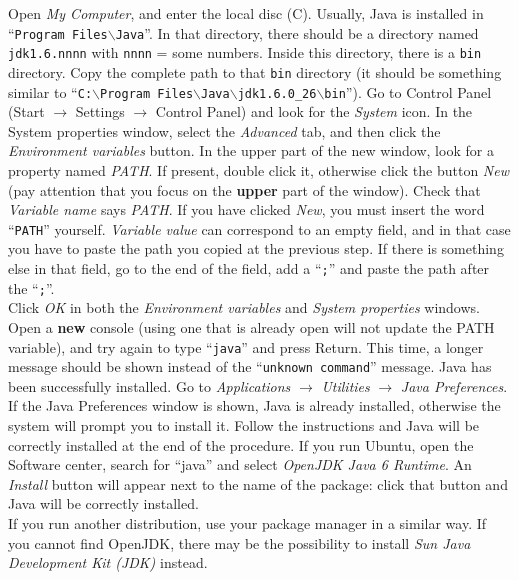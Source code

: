 \begin{enumerate}
{Open \emph{My Computer}, and enter the local disc (C). Usually, Java is installed in ``{\tt Program
Files$\backslash{}$Java}''. In that directory,
there should be a directory named {\tt jdk1.6.nnnn} with {\tt nnnn} = some numbers.
Inside this directory, there is a {\tt bin} directory. Copy the complete path to that {\tt bin} directory (it should be
something similar to
``{\tt C:$\backslash{}$Program Files$\backslash{}$Java$\backslash{}$jdk1.6.0\_{}26$\backslash{}$bin}'').
Go to Control Panel (Start $\rightarrow$ Settings $\rightarrow$ Control Panel) and look for the \emph{System} icon.
In the System properties window, select the \emph{Advanced} tab, and then click the \emph{Environment variables}
button.
In the upper part of the new window, look for a property named \emph{PATH}. If present, double click it,
otherwise click the button \emph{New} (pay attention that you focus on the {\bfseries upper} part of the window).
Check that \emph{Variable name} says \emph{PATH}. If you have clicked \emph{New}, you must insert the word ``{\tt PATH}''
yourself.
\emph{Variable value} can correspond to an empty field, and in that case you have to paste the path you copied at
the previous step.
If there is something else in that field, go to the end of the field, add a ``{\tt ;}'' and paste the path after the ``{\tt ;}''.\\
Click \emph{OK} in both the \emph{Environment variables} and \emph{System properties} windows.\\
Open a {\bfseries new} console (using one that is already open will not update the PATH variable), and try again to type
``{\tt java}'' and press Return. This time, a longer
message should be shown instead of the ``{\tt unknown command}'' message. Java has been successfully installed.}%
{Go to \emph{Applications} $\rightarrow$ \emph{Utilities} $\rightarrow$ \emph{Java Preferences}.\\
If the Java Preferences window is shown, Java is already installed, otherwise the system will prompt you to install
it. Follow the instructions and Java will be correctly installed at the end of the procedure.}%
{If you run Ubuntu, open the Software center, search for ``java'' and select \emph{OpenJDK Java 6 Runtime}. An
\emph{Install} button
will appear next to the name of the package: click that button and Java will be correctly installed.\\
If you run another distribution, use your package manager in a similar way. If you cannot find OpenJDK, there may be
the possibility to install \emph{Sun Java Development Kit (JDK)} instead.}
\end{enumerate}


